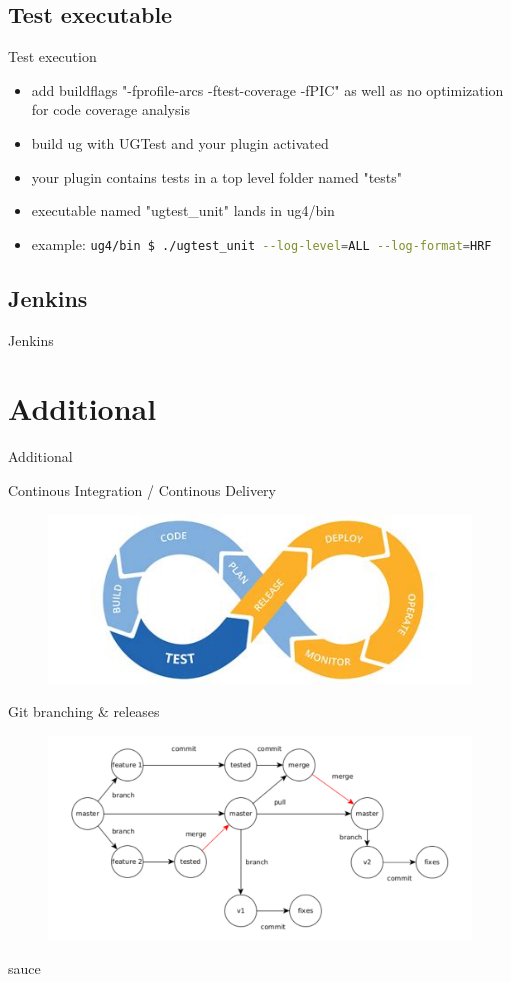 \documentclass{beamer}
\newcommand{\sectiontitle}[1]{
    \section{#1}
    \begin{frame}
        \centering
        \Huge{#1}
    \end{frame}
}
\newcommand{\subsectiontitle}[1]{
    \subsection{#1}
    \begin{frame}
        \LARGE{#1}
    \end{frame}
}
\begin{document}
        \subsection{Test executable}
        \begin{frame}{Test execution}
            \begin{itemize}
                \item add buildflags "-fprofile-arcs -ftest-coverage -fPIC" as well as no optimization for code coverage analysis
                \item build ug with UGTest and your plugin activated
                \item your plugin contains tests in a top level folder named "tests"
                \item executable named "ugtest\_unit" lands in ug4/bin
                \item example: \lstinline[language=bash]{ug4/bin $ ./ugtest_unit --log-level=ALL --log-format=HRF}
            \end{itemize}
        \end{frame}
        
        \subsectiontitle{Jenkins}

    \sectiontitle{Additional}
    \begin{frame}{Continous Integration / Continous Delivery}
        \centering
        \begin{figure}
            \includegraphics[width=12cm]{./images/cicd.jpeg}
        \end{figure}
    \end{frame}

    \begin{frame}[plain]{Git branching \& releases}
        \centering
        \begin{figure}
            \includegraphics[width=12cm]{images/branching.pdf} 
        \end{figure}
        sauce
    \end{frame}
   
\end{document}
